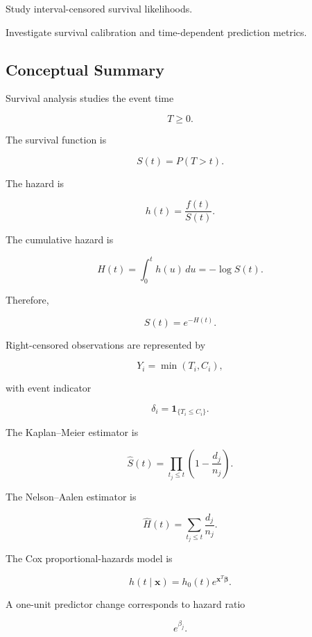 \begin{exercise}[4]
Study interval-censored survival likelihoods.
\end{exercise}

\begin{exercise}[4]
Investigate survival calibration and time-dependent prediction metrics.
\end{exercise}

\subsection{Conceptual Summary}
\label{subsec:survival-summary}

Survival analysis studies the event time

\[
\boxed{
T\geq0.
}
\]

The survival function is

\[
\boxed{
S(t)
=
P(T>t).
}
\]

The hazard is

\[
\boxed{
h(t)
=
\frac{
f(t)
}{
S(t)
}.
}
\]

The cumulative hazard is

\[
\boxed{
H(t)
=
\int_0^t
h(u)\,du
=
-\log S(t).
}
\]

Therefore,

\[
\boxed{
S(t)
=
e^{-H(t)}.
}
\]

Right-censored observations are represented by

\[
\boxed{
Y_i
=
\min(T_i,C_i),
}
\]

with event indicator

\[
\boxed{
\delta_i
=
\mathbf{1}_{\{T_i\leq C_i\}}.
}
\]

The Kaplan--Meier estimator is

\[
\boxed{
\widehat{S}(t)
=
\prod_{t_j\leq t}
\left(
1-
\frac{
d_j
}{
n_j
}
\right).
}
\]

The Nelson--Aalen estimator is

\[
\boxed{
\widehat{H}(t)
=
\sum_{t_j\leq t}
\frac{
d_j
}{
n_j
}.
}
\]

The Cox proportional-hazards model is

\[
\boxed{
h
(
t\mid\mathbf{x}
)
=
h_0(t)
e^{\mathbf{x}^T\boldsymbol{\beta}}.
}
\]

A one-unit predictor change corresponds to hazard ratio

\[
\boxed{
e^{\beta_j}.
}
\]

